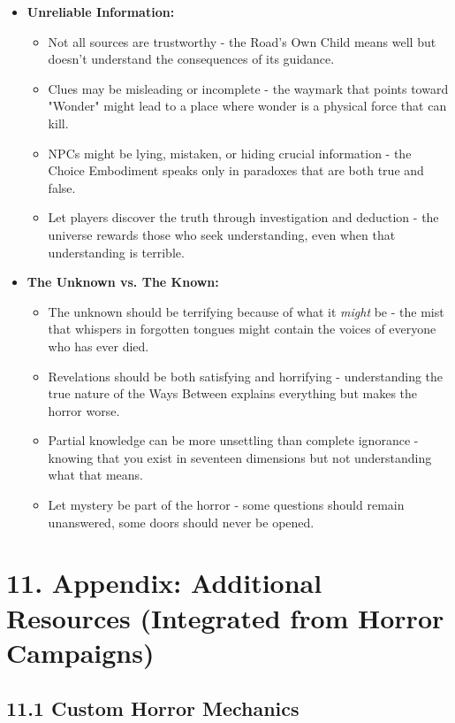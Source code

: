\documentclass[11pt]{article}
\begin{document}
\begin{itemize}
\item \textbf{Unreliable Information:}
\begin{itemize}
\item Not all sources are trustworthy - the Road's Own Child means well but doesn't understand the consequences of its guidance.
\item Clues may be misleading or incomplete - the waymark that points toward "Wonder" might lead to a place where wonder is a physical force that can kill.
\item NPCs might be lying, mistaken, or hiding crucial information - the Choice Embodiment speaks only in paradoxes that are both true and false.
\item Let players discover the truth through investigation and deduction - the universe rewards those who seek understanding, even when that understanding is terrible.
\end{itemize}
\item \textbf{The Unknown vs. The Known:}
\begin{itemize}
\item The unknown should be terrifying because of what it \textit{might} be - the mist that whispers in forgotten tongues might contain the voices of everyone who has ever died.
\item Revelations should be both satisfying and horrifying - understanding the true nature of the Ways Between explains everything but makes the horror worse.
\item Partial knowledge can be more unsettling than complete ignorance - knowing that you exist in seventeen dimensions but not understanding what that means.
\item Let mystery be part of the horror - some questions should remain unanswered, some doors should never be opened.
\end{itemize}
\end{itemize}

\clearpage

\section*{11. Appendix: Additional Resources (Integrated from Horror Campaigns)}

\subsection*{11.1 Custom Horror Mechanics}
\end{document}
